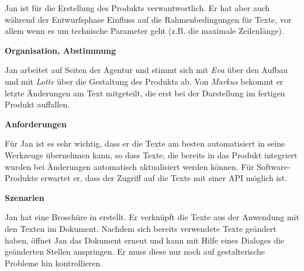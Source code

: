 \begin{multicols}{2}

\begin{center}
\end{center}


Jan ist für die Erstellung des Produkts verwantwortlich. Er hat aber auch während der Entwurfsphase Einfluss auf die Rahmenbedingungen für Texte, vor allem wenn es um technische Parameter geht (z.B. die maximale Zeilenlänge).

\textbf{Organisation, Abstimmung}

Jan arbeitet auf Seiten der Agentur und stimmt sich mit \emph{Eva} über den Aufbau und mit \emph{Lotte} über die Gestaltung des Produkts ab. Von \emph{Markus} bekommt er letzte Änderungen am Text mitgeteilt, die erst bei der Darstellung im fertigen Produkt auffallen.

\textbf{Anforderungen}

Für Jan ist es sehr wichtig, dass er die Texte am besten automatisiert in seine Werkzeuge übernehmen kann, so dass Texte, die bereits in das Produkt integriert wurden bei Änderungen automatisch aktualisiert werden können. Für Software-Produkte erwartet er, dass der Zugriff auf die Texte mit einer API möglich ist.

\columnbreak

\textbf{Szenarien}

Jan hat eine Broschüre in  erstellt. Er verknüpft die Texte aus der Anwendung mit den Texten im Dokument. Nachdem sich bereits verwendete Texte geändert haben, öffnet Jan das Dokument erneut und kann mit Hilfe eines Dialoges die geänderten Stellen anspringen. Er muss diese nur noch auf gestalterische Probleme hin kontrollieren.


\end{multicols}
